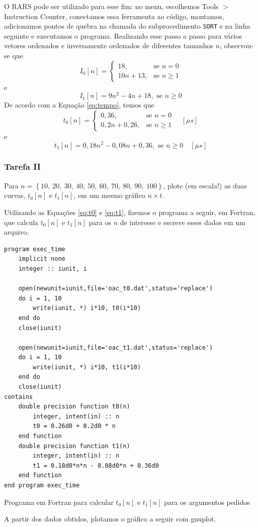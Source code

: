 \documentclass[a4paper,12pt]{article}
\newcommand{\cod}[1]{\texttt{#1}}
\newenvironment{code}{\captionsetup{type=listing}}{}
\begin{document}
O RARS pode ser utilizado para esse fim: no menu, escolhemos Tools $>$ Instruction Counter, conectamos essa ferramenta ao código, montamos, adicionamos pontos de quebra na chamada do subprocedimento \cod{SORT} e na linha seguinte e executamos o programa. Realizando esse passo a passo para vários vetores ordenados e inversamente ordenados de diferentes tamanhos $n$, observou-se que
\[
    I_0[n] = \begin{cases}
        18, &\text{se } n = 0 \\
        10n + 13, &\text{se } n \geq 1
    \end{cases}
\]
e
\[
    I_1[n] = 9n^2 - 4n + 18, \text{ se } n \geq 0
\]
De acordo com a Equação \eqref{eq:tempo}, temos que
\begin{equation}
    t_0[n] = \begin{cases}
        0,36, &\text{se } n = 0 \\
        0,2n + 0,26, &\text{se } n \geq 1
    \end{cases}
    \quad \left[ \mu s\right] \label{eq:t0}
\end{equation}
e
\begin{equation}
    t_1[n] = 0,18 n^2 - 0,08n + 0,36, \text{ se } n \geq 0 \quad \left[ \mu s\right] \label{eq:t1}
\end{equation}

\subsubsection{Tarefa II}
\begin{tcolorbox}[title=Enunciado, colback=blue!5!white, colframe=blue!75!black]
Para $n = \left\{10,\ 20,\ 30,\ 40,\ 50,\ 60,\ 70,\ 80,\ 90,\ 100 \right\}$, plote (em escala!) as duas curvas, $t_0[n]$ e $t_1[n]$, em um mesmo gráfico $n \times t$.
\end{tcolorbox}

Utilizando as Equações \eqref{eq:t0} e \eqref{eq:t1}, fizemos o programa a seguir, em Fortran, que calcula $t_0[n]$ e $t_1[n]$ para os $n$ de interesse e escreve esses dados em um arquivo.
\begin{code}
    \begin{verbatim}
program exec_time
    implicit none
    integer :: iunit, i
    
    open(newunit=iunit,file='oac_t0.dat',status='replace')
    do i = 1, 10
        write(iunit, *) i*10, t0(i*10)
    end do
    close(iunit)
    
    open(newunit=iunit,file='oac_t1.dat',status='replace')
    do i = 1, 10
        write(iunit, *) i*10, t1(i*10)
    end do
    close(iunit)
contains
    double precision function t0(n)
        integer, intent(in) :: n
        t0 = 0.26d0 + 0.2d0 * n
    end function
    double precision function t1(n)
        integer, intent(in) :: n
        t1 = 0.18d0*n*n - 0.08d0*n + 0.36d0
    end function
end program exec_time
    \end{verbatim}
    \vspace{-12pt}
    \caption{Programa em Fortran para calcular $t_0[n]$ e $t_1[n]$ para os argumentos pedidos}
\end{code}
\noindent A partir dos dados obtidos, plotamos o gráfico a seguir com gnuplot.
\end{document}
